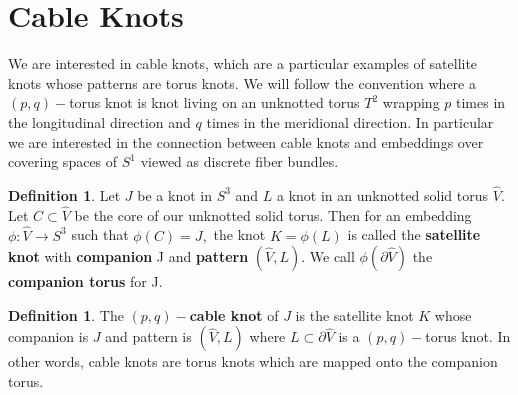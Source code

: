 \documentclass[a4paper, 12 pt, reqno]{amsart}
\newtheorem{prop}[theorem]{Proposition}
\theoremstyle{definition}
\newtheorem{definition}[theorem]{Definition}
\theoremstyle{remark}
\DeclareMathOperator{\cbl}{\mathsf{cable}}
\begin{document}







\section{Cable Knots} We are interested in cable knots, which are a particular examples of satellite knots whose patterns are torus knots. We will follow the convention where a $(p, q)-$torus knot is knot living on an unknotted torus $T^{2}$ wrapping $p$ times in the longitudinal direction and $q$ times in the meridional direction. In particular we are interested in the connection between cable knots and embeddings over covering spaces of $S^{1}$  viewed as discrete fiber bundles. 

\begin{definition} 
Let $J$ be a knot in $S^{3}$ and $L$ a knot in an unknotted solid torus $\hat{V}$. Let $C \subset \hat{V}$ be the core of our unknotted solid torus. Then for an embedding $\phi: \hat{V} \rightarrow S^{3}$ such that $\phi(C) = J,$ the knot $K = \phi(L)$ is called the \textbf{satellite knot} with \textbf{companion} J and \textbf{pattern} $(\hat{V}, L).$ We call $\phi(\partial\hat{V})$ the \textbf{companion torus} for J.
\end{definition} %

\begin{definition} 
The \textbf{$(p,q)-$cable knot} of $J$ is the satellite knot $K$ whose companion is $J$ and pattern is $(\hat{V}, L)$ where $L \subset \partial\hat{V}$ is a $(p, q)-$torus knot. In other words, cable knots are torus knots which are mapped onto the companion torus.
\end{definition}
\end{document}
